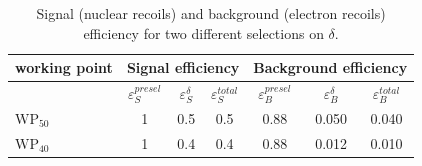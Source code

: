 \begin{table}[t]
\centering
\normalsize
\begin{tabular}{l c c c | c c c }
  \hline\hline
  working point & \multicolumn{3}{c}{Signal efficiency} & \multicolumn{3}{c}{Background efficiency} \\
  \hline
  & $\varepsilon_{S}^{presel}$ & $\varepsilon_{S}^{\delta}$ & $\varepsilon_{S}^{total}$ & $\varepsilon_{B}^{presel}$ & $\varepsilon_{B}^{\delta}$ & $\varepsilon_{B}^{total}$ \\
  \hline
  $\mathrm{WP}_{50}$  & 1                        & 0.5                      & 0.5                     & 0.88                     & 0.050                     & 0.040 \\
  $\mathrm{WP}_{40}$  & 1                        & 0.4                      & 0.4                     & 0.88                     & 0.012                     & 0.010 \\
  \hline\hline
\end{tabular}
\caption{Signal (nuclear recoils) and background (electron recoils) efficiency for
  two different selections on $\delta$.\label{tab:roc}}
\end{table}


